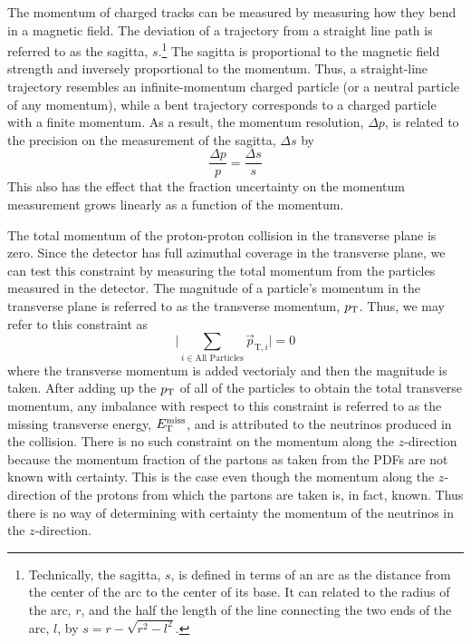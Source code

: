 The momentum of charged tracks can be measured by measuring how they 
bend in a magnetic field. The deviation of a trajectory
from a straight line path is referred to as the 
sagitta, $s$.\footnote{Technically, the sagitta, $s$, is defined in terms
of an arc as the distance from the center of the arc to the center of its
base. It can related to the radius of the arc, $r$, and the half the length
of the line connecting the two ends of the arc, $l$, by 
$s=r-\sqrt{r^2-l^2}$.} The sagitta is proportional to the magnetic
field strength and inversely proportional to the momentum.
Thus, a straight-line trajectory resembles an infinite-momentum charged
particle (or a neutral particle of any momentum), while
a bent trajectory corresponds to a charged particle with a finite momentum.
As a result, the momentum resolution, $\Delta p$, is related to the 
precision on the measurement of the sagitta, $\Delta s$ by
\begin{equation}
\frac{\Delta p }{p} = \frac{\Delta s}{s}
\label{eq:sagitta}
\end{equation}
This also has the effect that the fraction uncertainty on the momentum
measurement grows linearly as a function of the momentum.


The total momentum of the proton-proton collision in the transverse
plane is zero. Since the detector has full azimuthal coverage 
in the transverse plane, we can test this constraint by measuring
the total momentum from the particles measured in the detector.
The magnitude of a particle's momentum 
in the transverse plane is referred to as the 
transverse momentum, $p_{\mathrm{T}}$.
Thus, we may refer to this constraint as
\begin{equation}
\Bigg| \sum_{i\in\textrm{All Particles}} \vec{p}_{\textrm{T},i} \Bigg| = 0
\end{equation}
where the transverse momentum is added vectorialy and then
the magnitude is taken.
After adding up the $p_{\mathrm{T}}$ of all of the particles to obtain
the total transverse momentum, 
any imbalance with respect to this constraint
is referred to as the
missing transverse energy, $E_{\mathrm{T}}^{\mathrm{miss}}$, and is attributed to the 
neutrinos produced in the collision. 
There is no such constraint on the momentum along the $z$-direction
because the momentum fraction of the partons as taken
from the PDFs are not known with certainty. This is the case
even though the momentum along the $z$-direction of the 
protons from which the partons are taken is, in fact, known.
Thus there is no way of determining with certainty the 
momentum of the neutrinos in the $z$-direction.




